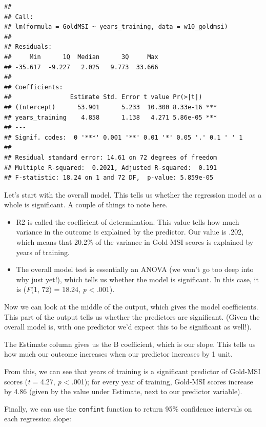 \documentclass[
]{book}
\providecommand{\tightlist}{%
  \setlength{\itemsep}{0pt}\setlength{\parskip}{0pt}}
\begin{document}
\begin{verbatim}
## 
## Call:
## lm(formula = GoldMSI ~ years_training, data = w10_goldmsi)
## 
## Residuals:
##     Min      1Q  Median      3Q     Max 
## -35.617  -9.227   2.025   9.773  33.666 
## 
## Coefficients:
##                Estimate Std. Error t value Pr(>|t|)    
## (Intercept)      53.901      5.233  10.300 8.33e-16 ***
## years_training    4.858      1.138   4.271 5.86e-05 ***
## ---
## Signif. codes:  0 '***' 0.001 '**' 0.01 '*' 0.05 '.' 0.1 ' ' 1
## 
## Residual standard error: 14.61 on 72 degrees of freedom
## Multiple R-squared:  0.2021, Adjusted R-squared:  0.191 
## F-statistic: 18.24 on 1 and 72 DF,  p-value: 5.859e-05
\end{verbatim}

Let's start with the overall model. This tells us whether the regression model as a whole is significant. A couple of things to note here.

\begin{itemize}
\tightlist
\item
  R2 is called the coefficient of determination. This value tells how much variance in the outcome is explained by the predictor. Our value is .202, which means that 20.2\% of the variance in Gold-MSI scores is explained by years of training.
\item
  The overall model test is essentially an ANOVA (we won't go too deep into why just yet!), which tells us whether the model is significant. In this case, it is (\emph{F}(1, 72) = 18.24, \emph{p} \textless{} .001).
\end{itemize}

Now we can look at the middle of the output, which gives the model coefficients. This part of the output tells us whether the predictors are significant. (Given the overall model is, with one predictor we'd expect this to be significant as well!).

The Estimate column gives us the B coefficient, which is our slope. This tells us how much our outcome increases when our predictor increases by 1 unit.

From this, we can see that years of training is a significant predictor of Gold-MSI scores (\emph{t} = 4.27, \emph{p} \textless{} .001); for every year of training, Gold-MSI scores increase by 4.86 (given by the value under Estimate, next to our predictor variable).

Finally, we can use the \texttt{confint} function to return 95\% confidence intervals on each regression slope:
\end{document}
